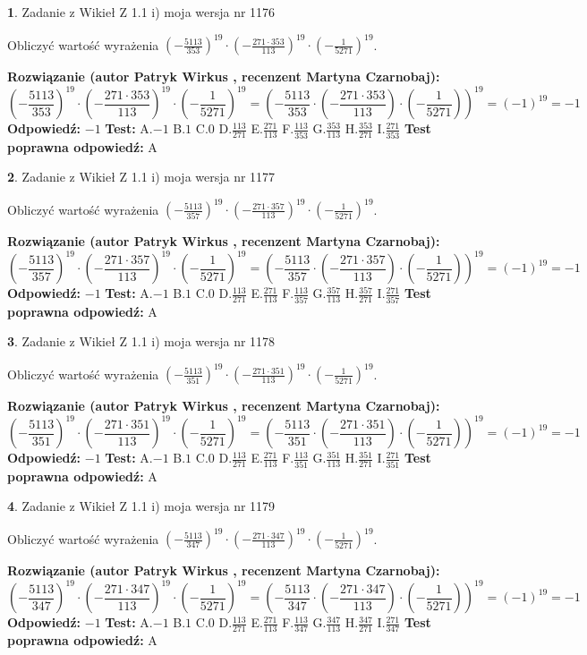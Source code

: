 \documentclass[12pt, a4paper]{article}
\theoremstyle{definition} %
\newtheorem{zad}{}
\newcommand{\zadStart}[1]{\begin{zad}#1\newline}
\newcommand{\zadStop}{\end{zad}}
\newcommand{\rozwStart}[2]{\noindent \textbf{Rozwiązanie (autor #1 , recenzent #2): }\newline}
\newcommand{\rozwStop}{\newline}
\newcommand{\odpStart}{\noindent \textbf{Odpowiedź:}\newline}
\newcommand{\odpStop}{\newline}
\newcommand{\testStart}{\noindent \textbf{Test:}\newline}
\newcommand{\testStop}{\newline}
\newcommand{\kluczStart}{\noindent \textbf{Test poprawna odpowiedź:}\newline}
\newcommand{\kluczStop}{\newline}
\begin{document}
\zadStart{Zadanie z Wikieł Z 1.1 i) moja wersja nr 1176}

Obliczyć wartość wyrażenia $(-\frac{5113}{353})^{19} \cdot (-\frac{271 \cdot 353}{113})^{19} \cdot (-\frac{1}{5271})^{19}$.
\zadStop
\rozwStart{Patryk Wirkus}{Martyna Czarnobaj}
$$(-\frac{5113}{353})^{19} \cdot (-\frac{271 \cdot 353}{113})^{19} \cdot (-\frac{1}{5271})^{19} = (-\frac{5113}{353} \cdot (-\frac{271 \cdot 353}{113}) \cdot (-\frac{1}{5271}))^{19} = (-1)^{19} = -1$$
\rozwStop
\odpStart
$-1$
\odpStop
\testStart
A.$-1$ B.$1$ C.$0$ D.$\frac{113}{271}$ E.$\frac{271}{113}$
F.$\frac{113}{353}$ G.$\frac{353}{113}$
H.$\frac{353}{271}$
I.$\frac{271}{353}$
\testStop
\kluczStart
A
\kluczStop



\zadStart{Zadanie z Wikieł Z 1.1 i) moja wersja nr 1177}

Obliczyć wartość wyrażenia $(-\frac{5113}{357})^{19} \cdot (-\frac{271 \cdot 357}{113})^{19} \cdot (-\frac{1}{5271})^{19}$.
\zadStop
\rozwStart{Patryk Wirkus}{Martyna Czarnobaj}
$$(-\frac{5113}{357})^{19} \cdot (-\frac{271 \cdot 357}{113})^{19} \cdot (-\frac{1}{5271})^{19} = (-\frac{5113}{357} \cdot (-\frac{271 \cdot 357}{113}) \cdot (-\frac{1}{5271}))^{19} = (-1)^{19} = -1$$
\rozwStop
\odpStart
$-1$
\odpStop
\testStart
A.$-1$ B.$1$ C.$0$ D.$\frac{113}{271}$ E.$\frac{271}{113}$
F.$\frac{113}{357}$ G.$\frac{357}{113}$
H.$\frac{357}{271}$
I.$\frac{271}{357}$
\testStop
\kluczStart
A
\kluczStop



\zadStart{Zadanie z Wikieł Z 1.1 i) moja wersja nr 1178}

Obliczyć wartość wyrażenia $(-\frac{5113}{351})^{19} \cdot (-\frac{271 \cdot 351}{113})^{19} \cdot (-\frac{1}{5271})^{19}$.
\zadStop
\rozwStart{Patryk Wirkus}{Martyna Czarnobaj}
$$(-\frac{5113}{351})^{19} \cdot (-\frac{271 \cdot 351}{113})^{19} \cdot (-\frac{1}{5271})^{19} = (-\frac{5113}{351} \cdot (-\frac{271 \cdot 351}{113}) \cdot (-\frac{1}{5271}))^{19} = (-1)^{19} = -1$$
\rozwStop
\odpStart
$-1$
\odpStop
\testStart
A.$-1$ B.$1$ C.$0$ D.$\frac{113}{271}$ E.$\frac{271}{113}$
F.$\frac{113}{351}$ G.$\frac{351}{113}$
H.$\frac{351}{271}$
I.$\frac{271}{351}$
\testStop
\kluczStart
A
\kluczStop



\zadStart{Zadanie z Wikieł Z 1.1 i) moja wersja nr 1179}

Obliczyć wartość wyrażenia $(-\frac{5113}{347})^{19} \cdot (-\frac{271 \cdot 347}{113})^{19} \cdot (-\frac{1}{5271})^{19}$.
\zadStop
\rozwStart{Patryk Wirkus}{Martyna Czarnobaj}
$$(-\frac{5113}{347})^{19} \cdot (-\frac{271 \cdot 347}{113})^{19} \cdot (-\frac{1}{5271})^{19} = (-\frac{5113}{347} \cdot (-\frac{271 \cdot 347}{113}) \cdot (-\frac{1}{5271}))^{19} = (-1)^{19} = -1$$
\rozwStop
\odpStart
$-1$
\odpStop
\testStart
A.$-1$ B.$1$ C.$0$ D.$\frac{113}{271}$ E.$\frac{271}{113}$
F.$\frac{113}{347}$ G.$\frac{347}{113}$
H.$\frac{347}{271}$
I.$\frac{271}{347}$
\testStop
\kluczStart
A
\kluczStop
\end{document}
